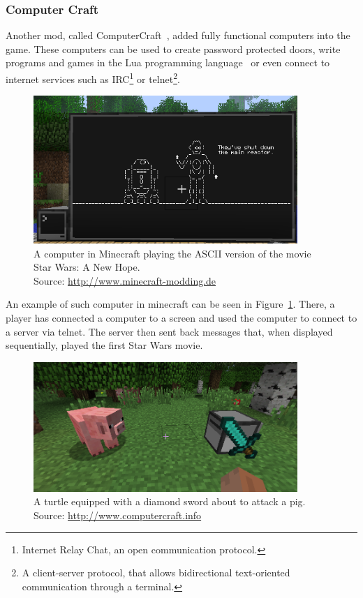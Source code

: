 \subsubsection{Computer Craft}

Another mod, called ComputerCraft~\cite{ComputerCraft}, added fully functional computers into the game. 
These computers can be used to create password protected
doors, write programs and games in the Lua programming language~\cite{Lua} or even connect to internet services such 
as IRC\footnote{Internet Relay Chat, an open communication 
protocol.} or telnet\footnote{A client-server protocol, that allows bidirectional text-oriented communication through a terminal.}.

\begin{figure}[H]
    \centering
    \includegraphics[width=10cm]{../img/ComputerCraft2.png}
    \caption{A computer in Minecraft playing the ASCII version of the movie Star Wars: A New Hope.
             \\Source: \href{http://minecraft-modding.de/wp-content/uploads/2015/06/ComputerCraft2.png}{http://www.minecraft-modding.de}}
    \label{computer-craft}
\end{figure}

An example of such computer in minecraft can be seen in Figure~\ref{computer-craft}. There, a player has connected a computer to a screen
and used the computer to connect to a server via telnet. The server then sent back messages that, when displayed sequentially, played
the first Star Wars movie.

\begin{figure}[H]
    \centering
    \includegraphics[width=10cm]{../img/CC-turtle.png}
    \caption{A turtle equipped with a diamond sword about to attack a pig.
             \\Source: \href{http://computercraft.info/wp-content/uploads/2012/07/piggy.png}{http://www.computercraft.info}}
    \label{cc-turtle}
\end{figure}

